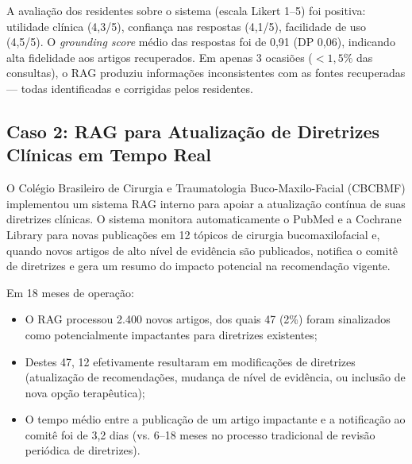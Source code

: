A avaliação dos residentes sobre o sistema (escala Likert 1--5) foi positiva: utilidade clínica (4,3/5), confiança nas respostas (4,1/5), facilidade de uso (4,5/5). O \textit{grounding score} médio das respostas foi de 0,91 (DP 0,06), indicando alta fidelidade aos artigos recuperados. Em apenas 3 ocasiões ($<1,5\%$ das consultas), o RAG produziu informações inconsistentes com as fontes recuperadas --- todas identificadas e corrigidas pelos residentes.

\subsection{Caso 2: RAG para Atualização de Diretrizes Clínicas em Tempo Real}

O Colégio Brasileiro de Cirurgia e Traumatologia Buco-Maxilo-Facial (CBCBMF) implementou um sistema RAG interno para apoiar a atualização contínua de suas diretrizes clínicas. O sistema monitora automaticamente o PubMed e a Cochrane Library para novas publicações em 12 tópicos de cirurgia bucomaxilofacial e, quando novos artigos de alto nível de evidência são publicados, notifica o comitê de diretrizes e gera um resumo do impacto potencial na recomendação vigente.


Em 18 meses de operação:
\begin{itemize}
    \item O RAG processou 2.400 novos artigos, dos quais 47 (2\%) foram sinalizados como potencialmente impactantes para diretrizes existentes;
    \item Destes 47, 12 efetivamente resultaram em modificações de diretrizes (atualização de recomendações, mudança de nível de evidência, ou inclusão de nova opção terapêutica);
    \item O tempo médio entre a publicação de um artigo impactante e a notificação ao comitê foi de 3,2 dias (vs. 6--18 meses no processo tradicional de revisão periódica de diretrizes).
\end{itemize}

